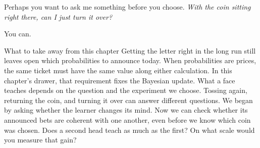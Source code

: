 Perhaps you want to ask me something before you choose. \emph{With the coin sitting right there, can I just turn it over?}

You can.

\begin{quadro}{What to take away from this chapter}
 Getting the letter right in the long run still leaves open which probabilities to announce today.
 When probabilities are prices, the same ticket must have the same value along either calculation. In this chapter's drawer, that requirement fixes the Bayesian update.
 What a face teaches depends on the question and the experiment we choose. Tossing again, returning the coin, and turning it over can answer different questions.
 We began by asking whether the learner changes its mind. Now we can check whether its announced bets are coherent with one another, even before we know which coin was chosen.
 Does a second head teach as much as the first? On what scale would you measure that gain?
\end{quadro}
